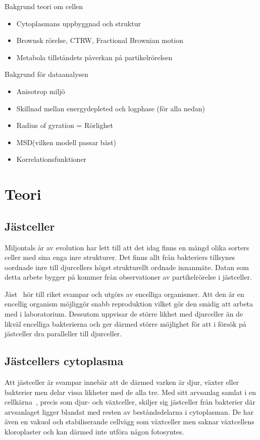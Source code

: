 

Bakgrund teori om cellen
\begin{itemize}
    \item Cytoplasmans uppbyggnad och struktur
    \item Brownsk rörelse, CTRW, Fractional Brownian motion
    \item Metabola tillståndets påverkan på partikelrörelsen
\end{itemize}
Bakgrund för dataanalysen
\begin{itemize}
    \item Anisotrop miljö
    \item Skillnad mellan energydepleted och logphase (för alla nedan)
    \item Radius of gyration = Rörlighet
    \item MSD(vilken modell passar bäst)
    \item Korrelationsfunktioner
\end{itemize}



\section{Teori}

\subsection{Jästceller}
Miljontals år av evolution har lett till att det idag finns en mängd
olika sorters celler med sina enga inre strukturer. %
Det finns allt från bakteriers tillsynes oordnade inre till
djurcellers högst strukturellt ordnade innanmäte. Datan som detta
arbete bygger på kommer från observationer av partikelrörelse i
jästceller. 

Jäst~\cite{SGD_yeast} hör till riket svampar och utgörs av encelliga
organismer.  Att den är en encellig organism möjliggör snabb
reproduktion vilket gör den smidig att arbeta med i
laboratorium. Dessutom uppvisar de större likhet med  djurceller än de
likväl encelliga bakterierna och ger därmed större möjlighet för att i
försök på jästceller dra paralleller till djurceller. 


\subsection{Jästcellers cytoplasma}
Att jästceller är svampar innebär att de därmed varken är djur, växter
eller bakterier men delar vissa likheter med de alla tre. Med sitt
arvsanlag samlat i en cellkärna~\cite{SGD_yeast}, precis som djur- och
växtceller, 
skiljer sig jästceller från bakterier där arvsanlaget ligger blandat
med resten av beståndsdelarna i cytoplasman.
De har även en vakuol och stabiliserande cellvägg som växtceller men
saknar växtcellens kloroplaster och kan därmed inte utföra någon
fotosyntes.



